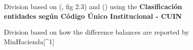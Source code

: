 \documentclass[
  ignorenonframetext,
]{beamer}
\begin{document}
\begin{frame}{}
\label{section-4}
\begin{figure}


\caption{\label{fig-division-public-sector-cuin-col}Division based on
(,
fig 2.3) and () using
the \textbf{Clasificación entidades según Código Único Institucional -
CUIN}}

\end{figure}%
\end{frame}

\begin{frame}{}
\label{section-5}
\begin{figure}


\caption{\label{fig-division-public-sector-minhacienda-col}Division
based on how the difference balances are reported by
MinHacienda{[}\^{}1{]}}

\end{figure}%
\end{frame}
\end{document}
